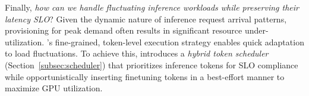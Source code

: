 Finally, \emph{how can we handle fluctuating inference workloads while preserving their latency SLO}?
%
Given the dynamic nature of inference request arrival patterns, provisioning for peak demand often results in significant resource under-utilization.
\Sys's fine-grained, token-level execution strategy enables quick adaptation to load fluctuations.
To achieve this, \sys introduces a {\em hybrid token scheduler} (Section~\ref{subsec:scheduler}) that prioritizes inference tokens for SLO compliance while opportunistically inserting finetuning tokens in a best-effort manner to maximize GPU utilization.